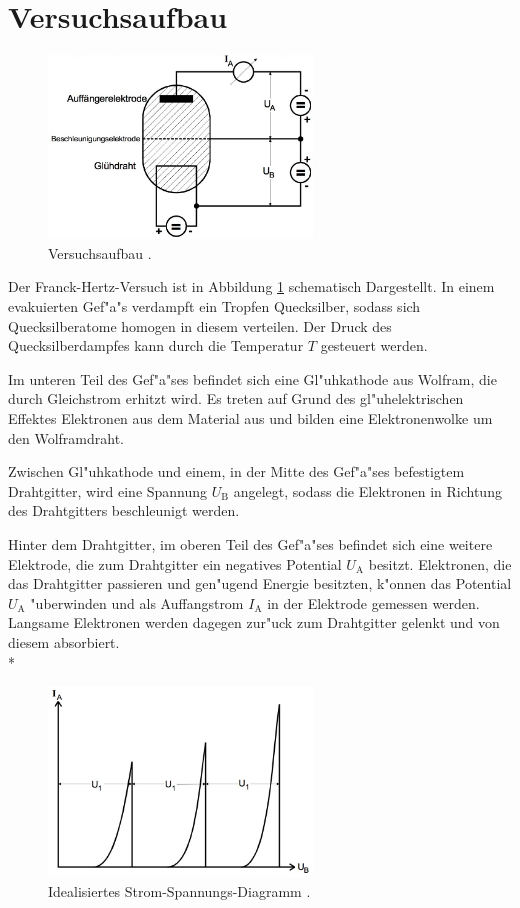 \section{Versuchsaufbau}
\label{sec:aufbau}

	\begin{figure}
		\centering
		\includegraphics[width = 7cm]{img/aufbau.jpeg}
		\caption{Versuchsaufbau \cite{anleitung}. \label{fig:aufbau}}
	\end{figure}
	Der Franck-Hertz-Versuch ist in Abbildung \ref{fig:aufbau} schematisch Dargestellt.
	In einem evakuierten Gef"a"s verdampft ein Tropfen Quecksilber, sodass sich Quecksilberatome homogen in diesem verteilen.
	Der Druck des Quecksilberdampfes kann durch die Temperatur $T$ gesteuert werden.

	Im unteren Teil des Gef"a"ses befindet sich eine Gl"uhkathode aus Wolfram, die durch Gleichstrom erhitzt wird.
	Es treten auf Grund des gl"uhelektrischen Effektes Elektronen aus dem Material aus und bilden eine Elektronenwolke um den Wolframdraht.

	Zwischen Gl"uhkathode und einem, in der Mitte des Gef"a"ses befestigtem Drahtgitter, wird eine Spannung $U_\mathrm{B}$ angelegt, sodass die Elektronen in Richtung des Drahtgitters beschleunigt werden.

	Hinter dem Drahtgitter, im oberen Teil des Gef"a"ses befindet sich eine weitere Elektrode, die zum Drahtgitter ein negatives Potential $U_\mathrm{A}$ besitzt.
	Elektronen, die das Drahtgitter passieren und gen"ugend Energie besitzten, k"onnen das Potential $U_\mathrm{A}$ "uberwinden und als Auffangstrom $I_\mathrm{A}$ in der Elektrode gemessen werden.
	Langsame Elektronen werden dagegen zur"uck zum Drahtgitter gelenkt und von diesem absorbiert. 
	\\*

	\begin{figure}
		\centering
		\includegraphics[width = 7cm]{img/strom-spannung.jpeg}
		\caption{Idealisiertes Strom-Spannungs-Diagramm \cite{anleitung}. \label{fig:strom-spannung}}
	\end{figure}

